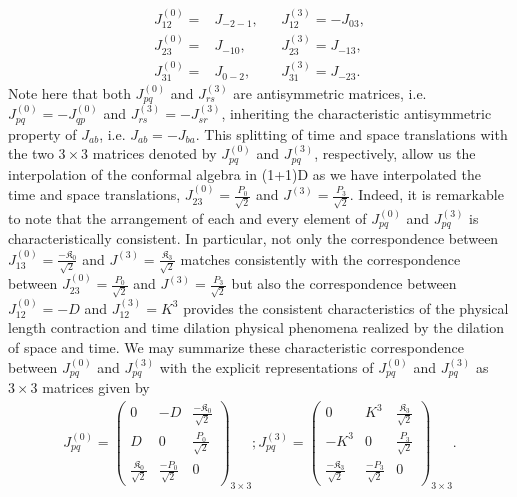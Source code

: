 \documentclass[%
 reprint,
superscriptaddress,
 amsmath,amssymb,
 aps,
]{revtex4-2}
\begin{document}
\begin{align}
\label{correspondence-of-matrix-elements}
    J^{(0)}_{12} =&J_{-2-1},&& J^{(3)}_{12} = -J_{03}, \nonumber\\
    J^{(0)}_{23} =&J_{-10} ,&& J^{(3)}_{23}=J_{-13},\nonumber\\
    J^{(0)}_{31}=&J_{0-2} ,&& J^{(3)}_{31}=J_{-23}.
\end{align}
Note here that both $J^{(0)}_{pq}$ and $J^{(3)}_{rs}$ are antisymmetric matrices, i.e. $J^{(0)}_{pq} = - J^{(0)}_{qp}$ and $J^{(3)}_{rs}=-J^{(3)}_{sr}$, inheriting the characteristic antisymmetric property of $J_{ab}$, i.e. $J_{ab}=-J_{ba}$.  
This splitting of time and space 
translations with the two $3\times3$ matrices denoted by $J^{(0)}_{pq}$ and $J^{(3)}_{pq}$, respectively, allow us the interpolation of the conformal algebra in (1+1)D as we have interpolated the time and space translations, $J^{(0)}_{23}=\frac{P_0}{\sqrt{2}}$ and $J^{(3)}=\frac{P_3}{\sqrt{2}}$. Indeed, it is remarkable to note that the arrangement of each and every element of $J^{(0)}_{pq}$ and $J^{(3)}_{pq}$ is characteristically consistent. In particular, not only the correspondence between $J^{(0)}_{13}=\frac{-\mathfrak{K}_0}{\sqrt{2}}$ and $J^{(3)}=\frac{\mathfrak{K}_3}{\sqrt{2}}$ matches consistently with the correspondence between $J^{(0)}_{23}=\frac{P_0}{\sqrt{2}}$ and $J^{(3)}=\frac{P_3}{\sqrt{2}}$ but also the correspondence between $J^{(0)}_{12}=-D$ and $J^{(3)}_{12}=K^3$ provides the consistent characteristics of the physical length contraction and time dilation physical phenomena realized by the dilation of space and time. 
We may summarize these characteristic correspondence between $J^{(0)}_{pq}$ and $J^{(3)}_{pq}$ with the explicit representations of $J^{(0)}_{pq}$ and $J^{(3)}_{pq}$ as $3\times3$ matrices given by 
\begin{align}
  J^{(0)}_{p q}=
  \begin{pmatrix}
  0&-D&\frac{-\mathfrak{K}_0}{\sqrt{2}}\\
  D&0&\frac{P_0}{\sqrt{2}}\\
    \frac{\mathfrak{K}_0}{\sqrt{2}}&\frac{-P_0}{\sqrt{2}}&0  
  \end{pmatrix}_{3\times3}; J^{(3)}_{pq}=
  \begin{pmatrix}
  0&K^3&\frac{\mathfrak{K}_3}{\sqrt{2}}\\
  -K^3&0&\frac{P_3}{\sqrt{2}}\\
    \frac{-\mathfrak{K}_3}{\sqrt{2}}&\frac{-P_3}{\sqrt{2}}&0  
  \end{pmatrix}_{3\times3}.
\end{align}
\end{document}
